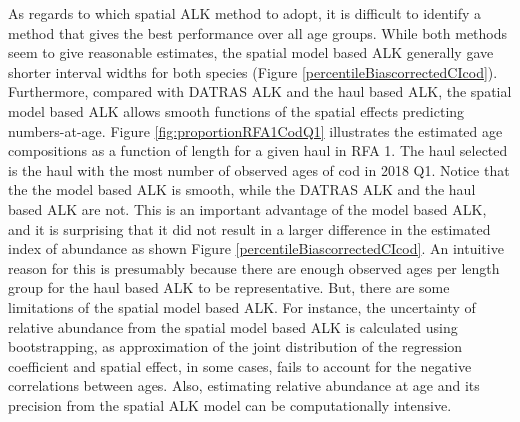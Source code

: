 \documentclass[a4paper 12pt]{article}
\numberwithin{equation}{section}
\begin{document}
As regards to which spatial ALK method to adopt, it is difficult to identify a method that gives the best performance over all age groups. While both methods seem to give reasonable estimates, the spatial model based ALK generally gave shorter interval widths for both species (Figure \ref{percentileBiascorrectedCIcod}). Furthermore, compared with DATRAS ALK and the haul based ALK, the spatial model based ALK allows smooth functions of the spatial effects predicting numbers-at-age. Figure \ref{fig:proportionRFA1CodQ1} illustrates the estimated age compositions as a function of length for a given haul in RFA 1. The haul selected is the haul with the most number of observed ages of cod in 2018 Q1. Notice that the the model based ALK is smooth, while the DATRAS ALK and the haul based ALK are not. This is an important advantage of the model based ALK, and it is surprising that it did not result in a larger difference in the estimated index of abundance as shown Figure \ref{percentileBiascorrectedCIcod}. An intuitive reason for this is presumably because there are enough observed ages per length group for the haul based ALK to be representative. But, there are some limitations of the spatial model based ALK. For instance, the uncertainty of relative abundance from the spatial model based ALK is calculated using bootstrapping, as approximation of the joint distribution of the regression coefficient and spatial effect, in some cases, fails to account for the  negative correlations between ages. Also, estimating relative abundance at age and its precision from the spatial ALK model can be computationally intensive. 
\end{document}
